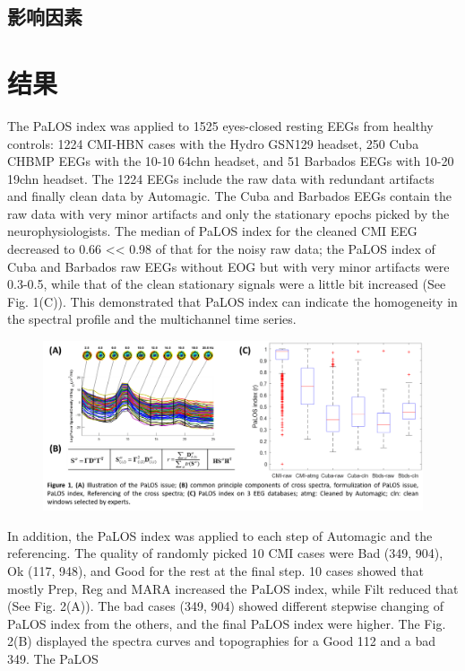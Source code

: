 \subsection{影响因素}

\section{结果}
The PaLOS index was applied to 1525 eyes-closed resting EEGs from healthy controls: 1224 CMI-HBN cases with
the Hydro GSN129 headset, 250 Cuba CHBMP EEGs with the 10-10 64chn headset, and 51 Barbados EEGs with
10-20 19chn headset. The 1224 EEGs include the raw data with redundant artifacts and finally clean data by
Automagic. The Cuba and Barbados EEGs contain the raw data with very minor artifacts and only the stationary
epochs picked by the neurophysiologists. The median of PaLOS index for the cleaned CMI EEG decreased to 0.66
<< 0.98 of that for the noisy raw data; the PaLOS index of Cuba and Barbados raw EEGs without EOG but with
very minor artifacts were 0.3-0.5, while that of the clean stationary signals were a little bit increased (See Fig.
1(C)). This demonstrated that PaLOS index can indicate the homogeneity in the spectral profile and the
multichannel time series.
\begin{figure}[!ht]
	\includegraphics[width=15cm]{pic/palos/figure1.png}
	\caption{}
	\label{fig1}
\end{figure}
In addition, the PaLOS index was applied to each step of Automagic and the referencing. The quality of randomly
picked 10 CMI cases were Bad (349, 904), Ok (117, 948), and Good for the rest at the final step. 10 cases showed
that mostly Prep, Reg and MARA increased the PaLOS index, while Filt reduced that (See Fig. 2(A)). The bad cases
(349, 904) showed different stepwise changing of PaLOS index from the others, and the final PaLOS index were
higher. The Fig. 2(B) displayed the spectra curves and topographies for a Good 112 and a bad 349. The PaLOS
